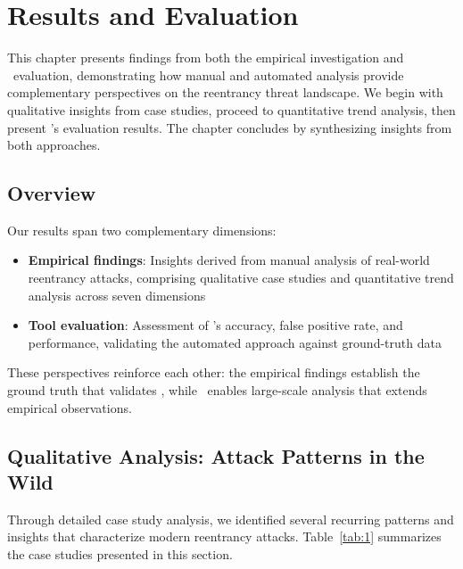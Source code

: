 \chapter{Results and Evaluation}
\label{ch:results}

This chapter presents findings from both the empirical investigation and \ToolName\ evaluation, demonstrating how manual and automated analysis provide complementary perspectives on the reentrancy threat landscape. We begin with qualitative insights from case studies, proceed to quantitative trend analysis, then present \ToolName's evaluation results. The chapter concludes by synthesizing insights from both approaches.

\section{Overview}
\label{sec:results-overview}

Our results span two complementary dimensions:

\begin{itemize}
    \item \textbf{Empirical findings}: Insights derived from manual analysis of  real-world reentrancy attacks, comprising qualitative case studies and quantitative trend analysis across seven dimensions

    \item \textbf{Tool evaluation}: Assessment of \ToolName's accuracy, false positive rate, and performance, validating the automated approach against ground-truth data
\end{itemize}

These perspectives reinforce each other: the empirical findings establish the ground truth that validates \ToolName, while \ToolName\ enables large-scale analysis that extends empirical observations.

\section{Qualitative Analysis: Attack Patterns in the Wild}
\label{sec:results-qualitative}

Through detailed case study analysis, we identified several recurring patterns and insights that characterize modern reentrancy attacks. Table~\ref{tab:1} summarizes the case studies presented in this section.

